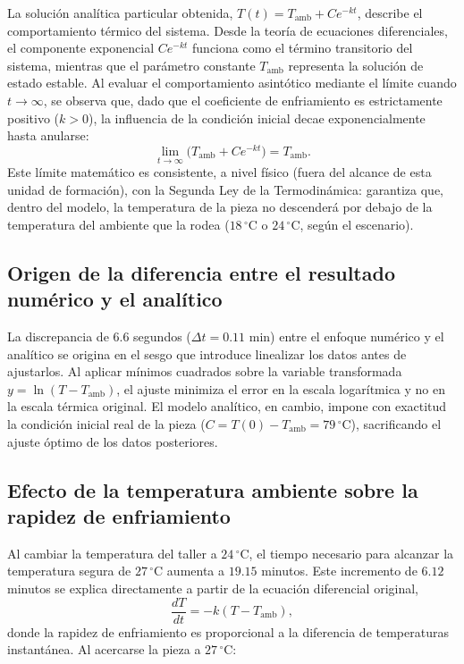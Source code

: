 \documentclass[11pt,onecolumn,letterpaper]{article}
\newcommand{\Tamb}{T_{\mathrm{amb}}}
\begin{document}
La solución analítica particular obtenida, \(T(t)=\Tamb+Ce^{-kt}\), describe el comportamiento térmico del sistema. Desde la teoría de ecuaciones diferenciales, el componente exponencial \(Ce^{-kt}\) funciona como el término transitorio del sistema, mientras que el parámetro constante \(\Tamb\) representa la solución de estado estable. Al evaluar el comportamiento asintótico mediante el límite cuando \(t\to\infty\), se observa que, dado que el coeficiente de enfriamiento es estrictamente positivo (\(k>0\)), la influencia de la condición inicial decae exponencialmente hasta anularse:
\[
\lim_{t\to\infty}\bigl(\Tamb+Ce^{-kt}\bigr)=\Tamb.
\]
Este límite matemático es consistente, a nivel físico (fuera del alcance de esta unidad de formación), con la Segunda Ley de la Termodinámica: garantiza que, dentro del modelo, la temperatura de la pieza no descenderá por debajo de la temperatura del ambiente que la rodea (\(18\,^{\circ}\mathrm{C}\) o \(24\,^{\circ}\mathrm{C}\), según el escenario).

\subsection{Origen de la diferencia entre el resultado numérico y el analítico}

La discrepancia de \(6.6\) segundos (\(\Delta t=0.11\) min) entre el enfoque numérico y el analítico se origina en el sesgo que introduce linealizar los datos antes de ajustarlos. Al aplicar mínimos cuadrados sobre la variable transformada \(y=\ln(T-\Tamb)\), el ajuste minimiza el error en la escala logarítmica y no en la escala térmica original. El modelo analítico, en cambio, impone con exactitud la condición inicial real de la pieza (\(C=T(0)-\Tamb=79\,^{\circ}\mathrm{C}\)), sacrificando el ajuste óptimo de los datos posteriores.

\subsection{Efecto de la temperatura ambiente sobre la rapidez de enfriamiento}

Al cambiar la temperatura del taller a \(24\,^{\circ}\mathrm{C}\), el tiempo necesario para alcanzar la temperatura segura de \(27\,^{\circ}\mathrm{C}\) aumenta a \(19.15\) minutos. Este incremento de \(6.12\) minutos se explica directamente a partir de la ecuación diferencial original,
\[
\frac{dT}{dt}=-k(T-\Tamb),
\]
donde la rapidez de enfriamiento es proporcional a la diferencia de temperaturas instantánea. Al acercarse la pieza a \(27\,^{\circ}\mathrm{C}\):
\end{document}
